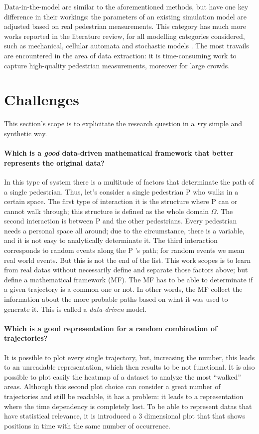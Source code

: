 \documentclass[class=article, crop=false]{standalone}
\begin{document}
Data-in-the-model are similar to the aforementioned methods, but have one key difference in their workings: the parameters of an existing simulation model are adjusted based on real pedestrian measurements. This category has much more works reported in the literature review, for all modelling categories considered, such as mechanical, cellular automata and stochastic models \cite{crowd_simulation,interactive_crowd_simulation,data_driven_simulation}. The most travails are encountered in the area of data extraction: it is time-consuming work to capture high-quality pedestrian measurements, moreover for large crowds.


\section{Challenges}
This section's scope is to explicitate the research question in a \verb"•"ry simple and synthetic way.

\paragraph{Which is a \emph{good} data-driven mathematical framework that better represents the original data?}
In this type of system there is a multitude of factors that determinate the path of a single pedestrian. 
Thus, let’s consider a single pedestrian P who walks in a certain space. 
The first type of interaction it is the structure where P can or cannot walk through; this structure is defined as the whole domain $\Omega$. 
The second interaction is between P and the other pedestrians. 
Every pedestrian needs a personal space all around; due to the circumstance, there is a variable, and it is not easy to analytically determinate it.
The third interaction corresponds to random events along the P ’s path; for random events we mean real world events.
But this is not the end of the list.
This work scopes is to learn from real datas without necessarily define and separate those factors above; but define a mathematical framework (MF).
The MF has to be able to determinate if a given trajectory is a common one or not. 
In other words, the MF collect the information about the more probable paths based on what it was used to generate it.
This is called a \emph{data-driven} model.


\paragraph{Which is a good representation for a random combination of trajectories?}
It is possible to plot every single trajectory, but, increasing the number, this leads to an unreadable representation, which then results to be not functional. 
It is also possible to plot easily the heatmap of a dataset to analyze the most “walked” areas. 
Although this second plot choice can consider a great number of trajectories and still be readable, it has a problem: it leads to a representation where the time dependency is completely lost.
To be able to represent datas that have statistical relevance, it is introduced a 3 dimensional plot that that shows positions in time with the same number of occurrence.
\end{document}
